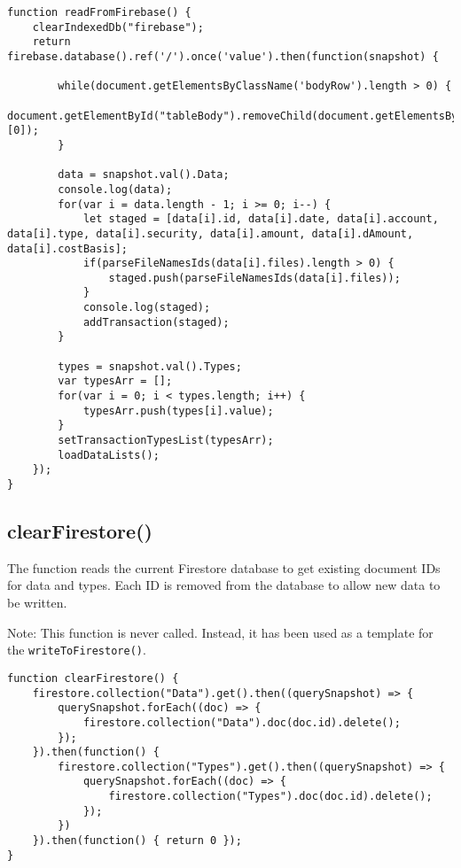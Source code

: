 \documentclass[letterpaper]{article}
\begin{document}
\begin{lstlisting}[firstnumber=33]
function readFromFirebase() {
    clearIndexedDb("firebase");
    return firebase.database().ref('/').once('value').then(function(snapshot) {

        while(document.getElementsByClassName('bodyRow').length > 0) {
            document.getElementById("tableBody").removeChild(document.getElementsByClassName('bodyRow')[0]);
        }

        data = snapshot.val().Data;
        console.log(data);
        for(var i = data.length - 1; i >= 0; i--) {
            let staged = [data[i].id, data[i].date, data[i].account, data[i].type, data[i].security, data[i].amount, data[i].dAmount, data[i].costBasis];
            if(parseFileNamesIds(data[i].files).length > 0) {
                staged.push(parseFileNamesIds(data[i].files));
            }
            console.log(staged);
            addTransaction(staged);
        }

        types = snapshot.val().Types;
        var typesArr = [];
        for(var i = 0; i < types.length; i++) {
            typesArr.push(types[i].value);
        }
        setTransactionTypesList(typesArr);
        loadDataLists();
    });
}
\end{lstlisting}

\subsection{clearFirestore()}

The function reads the current Firestore database to get existing document IDs for data and types.
Each ID is removed from the database to allow new data to be written.

Note: This function is never called.
Instead, it has been used as a template for the \lstinline{writeToFirestore()}.

\begin{lstlisting}[firstnumber=62]
function clearFirestore() {
    firestore.collection("Data").get().then((querySnapshot) => {
        querySnapshot.forEach((doc) => {
            firestore.collection("Data").doc(doc.id).delete();
        });
    }).then(function() {
        firestore.collection("Types").get().then((querySnapshot) => {
            querySnapshot.forEach((doc) => {
                firestore.collection("Types").doc(doc.id).delete();
            });
        })
    }).then(function() { return 0 });
}
\end{lstlisting}
\end{document}
